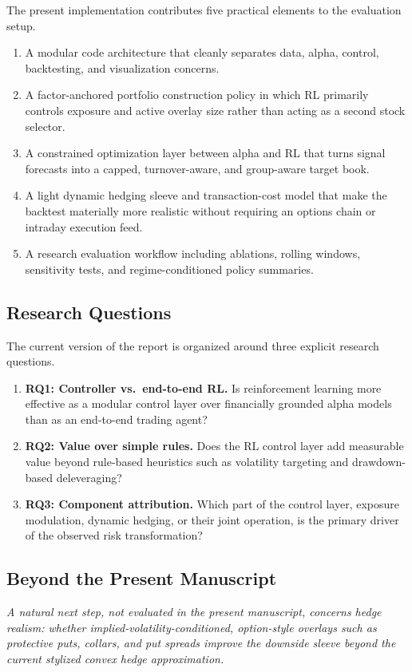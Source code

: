 \documentclass[10pt,twocolumn]{article}
\begin{document}
The present implementation contributes five practical elements to the evaluation
setup.
\begin{enumerate}[leftmargin=1.5em, itemsep=2pt, topsep=4pt]
\item A modular code architecture that cleanly separates data, alpha, control,
      backtesting, and visualization concerns.
\item A factor-anchored portfolio construction policy in which RL primarily
      controls exposure and active overlay size rather than acting as a second
      stock selector.
\item A constrained optimization layer between alpha and RL that turns signal
      forecasts into a capped, turnover-aware, and group-aware target book.
\item A light dynamic hedging sleeve and transaction-cost model that make the
      backtest materially more realistic without requiring an options chain or
      intraday execution feed.
\item A research evaluation workflow including ablations, rolling windows,
      sensitivity tests, and regime-conditioned policy summaries.
\end{enumerate}

\subsection{Research Questions}

The current version of the report is organized around three explicit research
questions.
\begin{enumerate}[leftmargin=1.5em, itemsep=2pt, topsep=4pt]
\item \textbf{RQ1: Controller vs.\ end-to-end RL.} Is reinforcement learning
      more effective as a modular control layer over financially grounded alpha
      models than as an end-to-end trading agent?
\item \textbf{RQ2: Value over simple rules.} Does the RL control layer add
      measurable value beyond rule-based heuristics such as volatility targeting
      and drawdown-based deleveraging?
\item \textbf{RQ3: Component attribution.} Which part of the control layer,
      exposure modulation, dynamic hedging, or their joint operation, is the
      primary driver of the observed risk transformation?
\end{enumerate}

\subsection*{Beyond the Present Manuscript}
\textit{A natural next step, not evaluated in the present manuscript, concerns
hedge realism: whether implied-volatility-conditioned, option-style overlays
such as protective puts, collars, and put spreads improve the downside sleeve
beyond the current stylized convex hedge approximation.}
\end{document}
